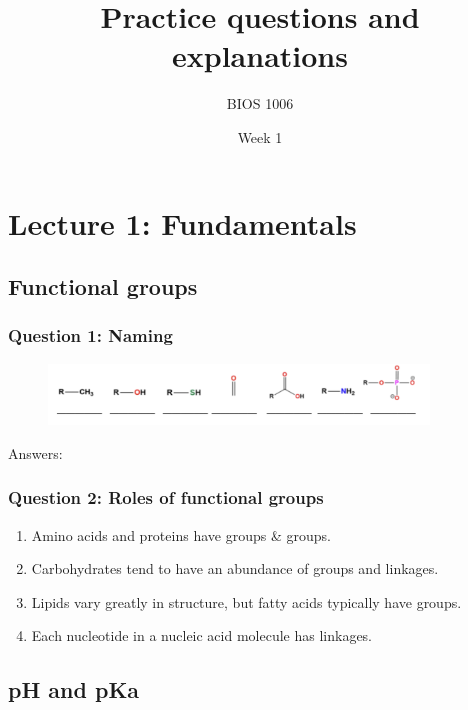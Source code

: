 \documentclass[letterpaper, 12pt]{article}
\title{Practice questions and explanations}
\author{BIOS 1006}
\date{Week 1}
\begin{document}
\maketitle

\section*{Lecture 1: Fundamentals}

\subsection*{Functional groups}

\subsubsection*{Question 1: Naming}

\begin{figure}[H]
\centering
\includegraphics[width=0.9\textwidth]{functionalgroups}
\end{figure}

Answers:


\subsubsection*{Question 2: Roles of functional groups}

\begin{enumerate}
\item Amino acids and proteins have  groups \&  groups.
\item Carbohydrates tend to have an abundance of  groups and  linkages.
\item Lipids vary greatly in structure, but fatty acids typically have  groups.
\item Each nucleotide in a nucleic acid molecule has  linkages.
\end{enumerate}

\subsection*{pH and pKa}
\end{document}
